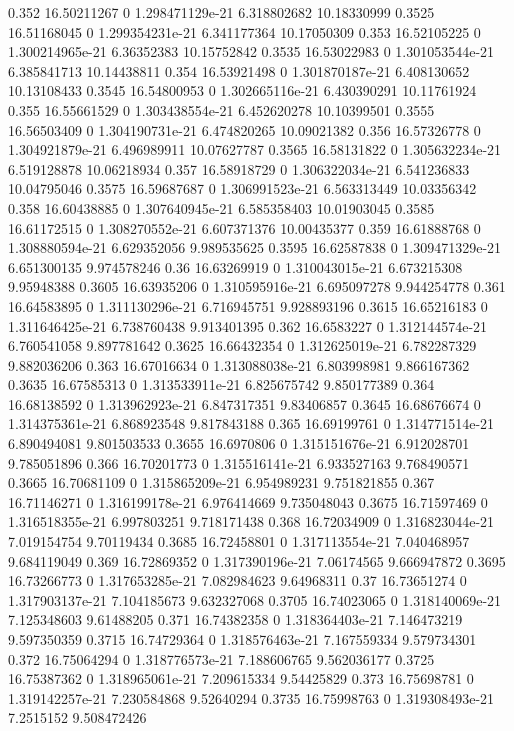 {0.352 16.50211267 0 1.298471129e-21 6.318802682 10.18330999
0.3525 16.51168045 0 1.299354231e-21 6.341177364 10.17050309
0.353 16.52105225 0 1.300214965e-21 6.36352383 10.15752842
0.3535 16.53022983 0 1.301053544e-21 6.385841713 10.14438811
0.354 16.53921498 0 1.301870187e-21 6.408130652 10.13108433
0.3545 16.54800953 0 1.302665116e-21 6.430390291 10.11761924
0.355 16.55661529 0 1.303438554e-21 6.452620278 10.10399501
0.3555 16.56503409 0 1.304190731e-21 6.474820265 10.09021382
0.356 16.57326778 0 1.304921879e-21 6.496989911 10.07627787
0.3565 16.58131822 0 1.305632234e-21 6.519128878 10.06218934
0.357 16.58918729 0 1.306322034e-21 6.541236833 10.04795046
0.3575 16.59687687 0 1.306991523e-21 6.563313449 10.03356342
0.358 16.60438885 0 1.307640945e-21 6.585358403 10.01903045
0.3585 16.61172515 0 1.308270552e-21 6.607371376 10.00435377
0.359 16.61888768 0 1.308880594e-21 6.629352056 9.989535625
0.3595 16.62587838 0 1.309471329e-21 6.651300135 9.974578246
0.36 16.63269919 0 1.310043015e-21 6.673215308 9.95948388
0.3605 16.63935206 0 1.310595916e-21 6.695097278 9.944254778
0.361 16.64583895 0 1.311130296e-21 6.716945751 9.928893196
0.3615 16.65216183 0 1.311646425e-21 6.738760438 9.913401395
0.362 16.6583227 0 1.312144574e-21 6.760541058 9.897781642
0.3625 16.66432354 0 1.312625019e-21 6.782287329 9.882036206
0.363 16.67016634 0 1.313088038e-21 6.803998981 9.866167362
0.3635 16.67585313 0 1.313533911e-21 6.825675742 9.850177389
0.364 16.68138592 0 1.313962923e-21 6.847317351 9.83406857
0.3645 16.68676674 0 1.314375361e-21 6.868923548 9.817843188
0.365 16.69199761 0 1.314771514e-21 6.890494081 9.801503533
0.3655 16.6970806 0 1.315151676e-21 6.912028701 9.785051896
0.366 16.70201773 0 1.315516141e-21 6.933527163 9.768490571
0.3665 16.70681109 0 1.315865209e-21 6.954989231 9.751821855
0.367 16.71146271 0 1.316199178e-21 6.976414669 9.735048043
0.3675 16.71597469 0 1.316518355e-21 6.997803251 9.718171438
0.368 16.72034909 0 1.316823044e-21 7.019154754 9.70119434
0.3685 16.72458801 0 1.317113554e-21 7.040468957 9.684119049
0.369 16.72869352 0 1.317390196e-21 7.06174565 9.666947872
0.3695 16.73266773 0 1.317653285e-21 7.082984623 9.64968311
0.37 16.73651274 0 1.317903137e-21 7.104185673 9.632327068
0.3705 16.74023065 0 1.318140069e-21 7.125348603 9.61488205
0.371 16.74382358 0 1.318364403e-21 7.146473219 9.597350359
0.3715 16.74729364 0 1.318576463e-21 7.167559334 9.579734301
0.372 16.75064294 0 1.318776573e-21 7.188606765 9.562036177
0.3725 16.75387362 0 1.318965061e-21 7.209615334 9.54425829
0.373 16.75698781 0 1.319142257e-21 7.230584868 9.52640294
0.3735 16.75998763 0 1.319308493e-21 7.2515152 9.508472426
}
